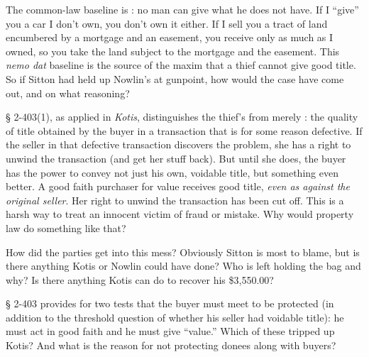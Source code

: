
\item The common-law baseline is : no man can
give what he does not have. If I ``give'' you a car I don't own, you don't own
it either. If I sell you a tract of land encumbered by a mortgage and an
easement, you receive only as much as I owned, so you take the land subject to
the mortgage and the easement. This \textit{nemo dat} baseline is the source of
the maxim that a thief cannot give good title. So if Sitton had held up
Nowlin's at gunpoint, how would the case have come out, and on what reasoning?

{\S} 2-403(1), as applied in \textit{Kotis}, distinguishes the thief's
 from merely :
the quality of title obtained by the
buyer in a transaction that is for some reason defective. If the seller in that
defective transaction discovers the problem, she has a right to unwind the
transaction (and get her stuff back). But until she does, the buyer has the
power to convey not just his own, voidable title, but something even better. A
good faith purchaser for value receives good title, \textit{even as against the
original seller}. Her right to unwind the transaction has been cut off. This is
a harsh way to treat an innocent victim of fraud or mistake. Why would property
law do something like that?


\item How did the parties get into this mess? Obviously Sitton is most to blame,
but is there anything Kotis or Nowlin could have done? Who is left holding the
bag and why? Is there anything Kotis can do to recover his \$3,550.00?


\item {\S} 2-403 provides for two tests that the buyer must meet to be protected
(in addition to the threshold question of whether his seller had voidable
title): he must act in good faith and he must give ``value.'' Which of these
tripped up Kotis? And what is the reason for not protecting donees along with
buyers? 

